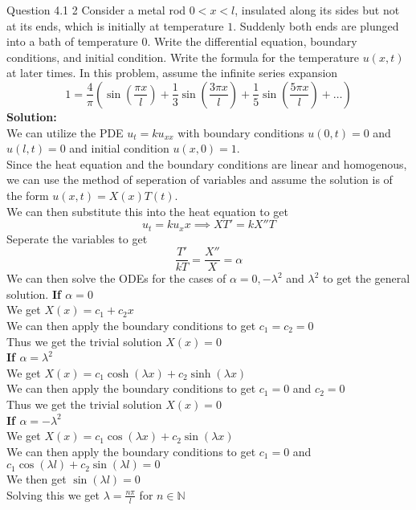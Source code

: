 \documentclass[answers,12pt,addpoints]{exam}
\begin{document}
\begin{questions}
    \question Question 4.1 2
    Consider a metal rod \(0 < x < l\), insulated along its sides but not at
    its ends, which is initially at temperature \(1\). Suddenly both ends are
    plunged into a bath of temperature \(0\). Write the differential equation,
    boundary conditions, and initial condition. Write the formula for the
    temperature \(u(x,t)\) at later times. In this problem, assume the infinite
    series expansion
    $$1 = \frac{4}{\pi}\left( \sin(\frac{\pi x}{l})+ \frac{1}{3}\sin(\frac{3\pi x}{l}) + \frac{1}{5}\sin(\frac{5\pi x}{l}) + \dots \right) $$
    \textbf{Solution:}\\
    We can utilize the PDE $u_t = ku_{xx}$ with boundary conditions $u(0,t) = 0$ and $u(l,t) = 0$ and initial condition $u(x,0) = 1$.\\
    Since the heat equation and the boundary conditions are linear and homogenous, we can use the method of seperation of variables and assume the solution is of the form $u(x,t) = X(x)T(t)$.\\
    We can then substitute this into the heat equation to get
    $$ u_t = ku_xx \implies XT' = kX''T$$
    Seperate the variables to get 
    $$ \frac{T'}{kT} = \frac{X''}{X} = \alpha$$
    We can then solve the ODEs for the cases of $\alpha = 0, -\lambda^2$ and $\lambda^2$ to get the general solution.
    \textbf{If $\alpha = 0$}\\
    We get $X(x) = c_1 + c_2x$\\
    We can then apply the boundary conditions to get $c_1 = c_2 = 0$\\
    Thus we get the trivial solution $X(x) = 0$\\
    \textbf{If $\alpha = \lambda^2$}\\
    We get $X(x) = c_1\cosh(\lambda x) + c_2\sinh(\lambda x)$\\
    We can then apply the boundary conditions to get $c_1 = 0$ and $c_2 = 0$\\
    Thus we get the trivial solution $X(x) = 0$ \\
    \textbf{If $\alpha = -\lambda^2$}\\
    We get $X(x) = c_1\cos(\lambda x) + c_2\sin(\lambda x)$\\
    We can then apply the boundary conditions to get $c_1 = 0$ and $c_1\cos(\lambda l) + c_2 \sin(\lambda l) = 0$\\
    We then get $ \sin(\lambda l) = 0$\\
    Solving this we get $\lambda = \frac{n\pi}{l}$ for $n \in \mathbb{N}$\\

\end{questions}
\end{document}
